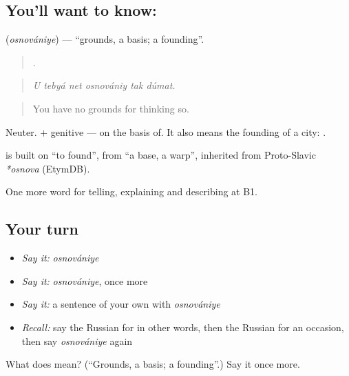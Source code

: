 \subsection*{You'll want to know: }
\textbf{} (\emph{osnovániye}) — \textquotedblleft{}grounds, a basis; a founding\textquotedblright{}.

\begin{quote}
     .
\end{quote}

\begin{quote}
\emph{U tebyá net osnovániy tak dúmat.}
\end{quote}

\begin{quote}
You have no grounds for thinking so.
\end{quote}

Neuter. \emph{ } + genitive — on the basis of. It also means the founding of a city: \emph{ }.

\begin{cousinweb}
\textbf{} is built on \emph{} \textquotedblleft{}to found\textquotedblright{}, from \emph{} \textquotedblleft{}a base, a warp\textquotedblright{}, inherited from Proto-Slavic \emph{*osnova} (EtymDB).
\end{cousinweb}

\begin{grammarlens}[title={What you've built}]
One more word for telling, explaining and describing at B1.
\end{grammarlens}

\subsection*{Your turn}
\begin{itemize}
\raggedright
  \item \emph{Say it:} \emph{osnovániye}
  \item \emph{Say it:} \emph{osnovániye}, once more
  \item \emph{Say it:} a sentence of your own with \emph{osnovániye}
  \item \emph{Recall:} say the Russian for in other words, then the Russian for an occasion, then say \emph{osnovániye} again
\end{itemize}

\begin{tcolorbox}[breakable,colback=teal!4,colframe=teal!35!black,title={Before you move on}]
What does  mean? (\textquotedblleft{}Grounds, a basis; a founding\textquotedblright{}.) Say it once more.
\end{tcolorbox}
